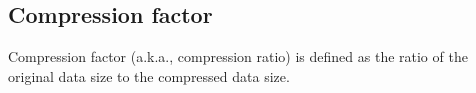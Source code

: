 \subsection{Compression factor}

Compression factor (a.k.a., compression ratio) is defined as the ratio of the original data size to the compressed data size. 


